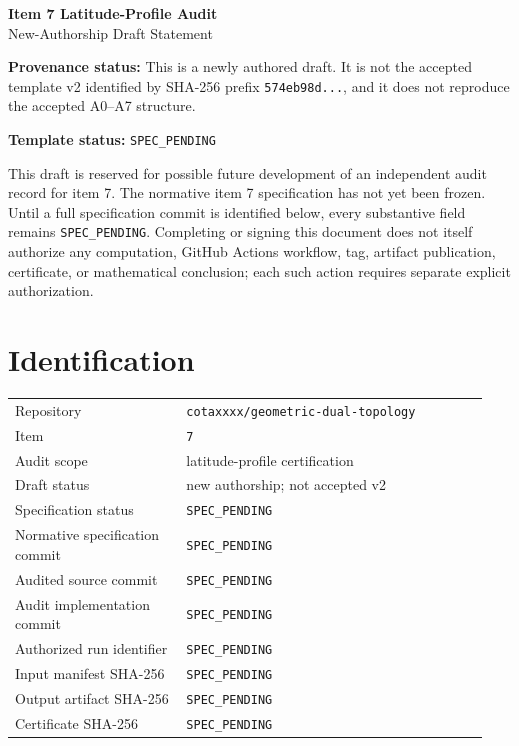 \documentclass[11pt]{article}
\newcommand{\specpending}{\texttt{SPEC\_PENDING}}
\begin{document}
\begin{center}
{\Large\bfseries Item 7 Latitude-Profile Audit}\\[4pt]
{\large New-Authorship Draft Statement}
\end{center}

\noindent\textbf{Provenance status:} This is a newly authored draft. It is
not the accepted template v2 identified by SHA-256 prefix
\texttt{574eb98d...}, and it does not reproduce the accepted A0--A7 structure.

\medskip
\noindent\textbf{Template status:} \specpending

\medskip
\noindent
This draft is reserved for possible future development of an independent
audit record for item 7. The normative item 7 specification has not yet been
frozen. Until a full specification commit is identified below, every
substantive field remains \specpending. Completing or signing this document
does not itself authorize any computation, GitHub Actions workflow, tag,
artifact publication, certificate, or mathematical conclusion; each such
action requires separate explicit authorization.

\section*{Identification}

\begin{tabular}{>{\raggedright\arraybackslash}p{0.34\linewidth}p{0.60\linewidth}}
Repository & \texttt{cotaxxxx/geometric-dual-topology} \\
Item & \texttt{7} \\
Audit scope & latitude-profile certification \\
Draft status & new authorship; not accepted v2 \\
Specification status & \specpending \\
Normative specification commit & \specpending \\
Audited source commit & \specpending \\
Audit implementation commit & \specpending \\
Authorized run identifier & \specpending \\
Input manifest SHA-256 & \specpending \\
Output artifact SHA-256 & \specpending \\
Certificate SHA-256 & \specpending \\
\end{tabular}
\end{document}
